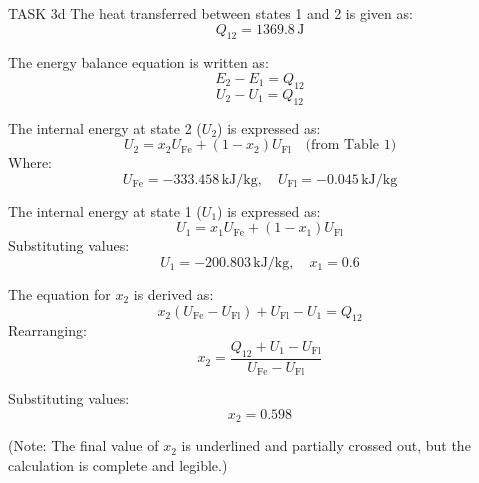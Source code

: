 TASK 3d  
The heat transferred between states 1 and 2 is given as:  
\[
Q_{12} = 1369.8 \, \text{J}
\]

The energy balance equation is written as:  
\[
E_2 - E_1 = Q_{12}
\]  
\[
U_2 - U_1 = Q_{12}
\]

The internal energy at state 2 (\(U_2\)) is expressed as:  
\[
U_2 = x_2 U_{\text{Fe}} + (1 - x_2) U_{\text{Fl}} \quad \text{(from Table 1)}
\]  
Where:  
\[
U_{\text{Fe}} = -333.458 \, \text{kJ/kg}, \quad U_{\text{Fl}} = -0.045 \, \text{kJ/kg}
\]

The internal energy at state 1 (\(U_1\)) is expressed as:  
\[
U_1 = x_1 U_{\text{Fe}} + (1 - x_1) U_{\text{Fl}}
\]  
Substituting values:  
\[
U_1 = -200.803 \, \text{kJ/kg}, \quad x_1 = 0.6
\]

The equation for \(x_2\) is derived as:  
\[
x_2 (U_{\text{Fe}} - U_{\text{Fl}}) + U_{\text{Fl}} - U_1 = Q_{12}
\]  
Rearranging:  
\[
x_2 = \frac{Q_{12} + U_1 - U_{\text{Fl}}}{U_{\text{Fe}} - U_{\text{Fl}}}
\]

Substituting values:  
\[
x_2 = 0.598
\]  

(Note: The final value of \(x_2\) is underlined and partially crossed out, but the calculation is complete and legible.)
